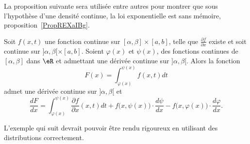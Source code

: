 La proposition suivante sera utilisée entre autres pour montrer que sous l'hypothèse d'une densité continue, la loi exponentielle est sans mémoire, proposition~\ref{PropREXaIBg}.
\begin{proposition}		\label{PropDerrFnAvecBornesFonctions}
Soit $f(x,t)$ une fonction continue sur $[\alpha,\beta]\times[a,b]$, telle que $\frac{ \partial f }{ \partial x }$ existe et soit continue sur $]\alpha,\beta[\times[a,b]$. Soient $\varphi(x)$ et $\psi(x)$, des fonctions continues de $[\alpha,\beta]$ dans $\eR$ et admettant une dérivée continue sur $]\alpha,\beta [$. Alors la fonction
\begin{equation}
	F(x)=\int_{\varphi(x)}^{\psi(x)}f(x,t)dt
\end{equation}
admet une dérivée continue sur $]\alpha,\beta[$ et
\begin{equation}	\label{EqFormDerrFnAvecBorneNInt}
	\frac{ dF }{ dx }=\int_{\varphi(x)}^{\psi(x)}\frac{ \partial f }{ \partial x }(x,t)dt+f\big( x,\psi(x) \big)\cdot\frac{ d\psi }{ dx }- f\big( x,\varphi(x) \big)\cdot\frac{ d\varphi }{ dx }.
\end{equation}
\end{proposition}

L'exemple qui suit devrait pouvoir être rendu rigoureux en utilisant des distributions correctement.

